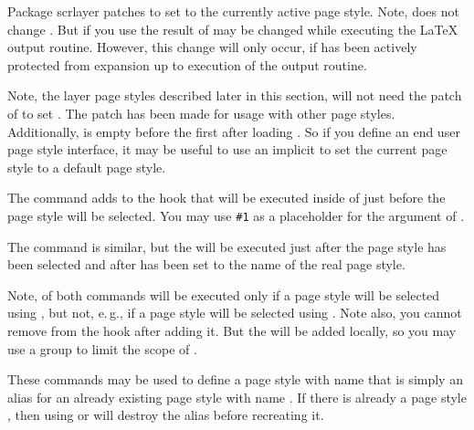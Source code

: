\begin{Declaration}
\end{Declaration}
Package scrlayer patches  to set  to
the currently active page style. Note,  does not change
. But if you use  the result of
 may be changed while executing the \LaTeX{} output
routine. However, this change will only occur, if  has
been actively protected from expansion up to execution of the output routine.

Note, the layer page styles described later in this section, will not need
the patch of  to set . The patch has
been made for usage with other page styles. Additionally, 
 is empty before the first  after
loading . So if you define an end user page style interface,
it may be useful to use an implicit  to set the current page
style to a default page style.%
\EndIndexGroup


\begin{Declaration}
\end{Declaration}
The command  adds  to the hook
that will be executed inside of  just before the page style
will be selected. You may use \texttt{\#1} as a placeholder for the argument
of .

The command  is similar, but the 
will be executed just after the page style has been selected and after
 has been set to the name of the real page style.

Note,  of both commands will be executed
only if a page style will be selected using , but not,
e.\,g., if a page style will be selected using . Note
also, you cannot remove  from the hook after adding it. But
the  will be added locally, so you may use a group to limit the
scope of .%
\EndIndexGroup


\begin{Declaration}
\end{Declaration}
These commands may be used to define a page style with name  that is simply an alias for an already existing page style with
name . If there is already a page style
, then using  or
 will destroy the alias before recreating it.

